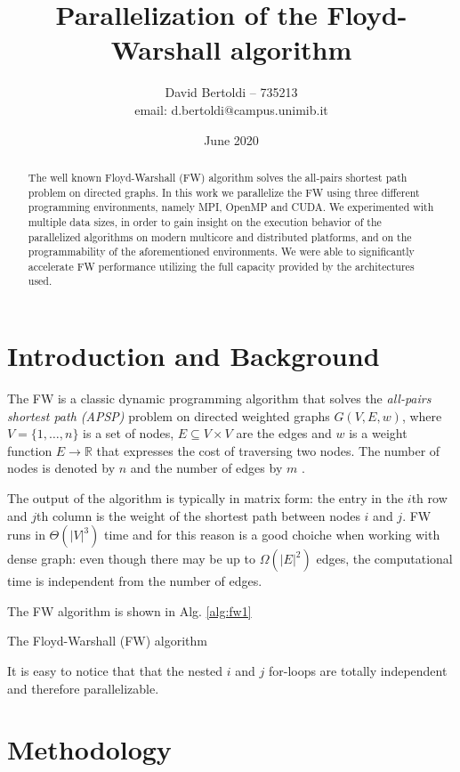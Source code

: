 \documentclass[twocolumns]{IEEEtran}
\title{Parallelization of the Floyd-Warshall algorithm}
\author{David Bertoldi -- 735213 \\ email: d.bertoldi@campus.unimib.it}
\affil{Department of Informatics, Systems and Communication}
\affil{University of Milano-Bicocca}
\date{June 2020}
\begin{document}
\maketitle 
\begin{abstract}
The well known Floyd-Warshall (FW) algorithm solves the all-pairs shortest path problem on directed graphs. In this work we parallelize the FW using three different
programming environments, namely MPI, OpenMP and CUDA. We experimented with multiple data sizes, in order to gain insight on the execution behavior
of the parallelized algorithms on modern multicore and distributed platforms, and on the programmability of the aforementioned environments. We were able
to significantly accelerate FW performance utilizing the full capacity provided by the architectures used.
\end{abstract}
\section{Introduction and Background}
The FW is a classic dynamic programming algorithm that solves the \emph{all-pairs shortest path (APSP)} problem on directed weighted
graphs $G(V, E, w)$, where $V = \{1, \dots, n\}$ is a set of nodes, $E \subseteq V \times V$ are the edges and $w$ is a weight function $E \rightarrow  \mathbb{R}$
that expresses the cost of traversing two nodes. The number of nodes is denoted by $n$ and the number of edges by $m$ . \par
The output of the algorithm is typically in matrix form: the entry in the $i$th row and $j$th column is the weight of the shortest path between
nodes $i$ and $j$. FW runs in $\Theta(|V|^3)$ time and for this reason is a good choiche when working with dense graph: even though there
may be up to $\Omega(|E|^2)$ edges, the computational time is independent from the number of edges. \par
The FW algorithm is shown in Alg. \ref{alg:fw1}

\begin{algorithm}[h!]
\label{alg:fw1}
\SetAlgoLined

 
 \caption[alg:fw1]{The Floyd-Warshall (FW) algorithm}
\end{algorithm}

It is easy to notice that that the nested $i$ and $j$ for-loops are totally independent and therefore parallelizable.


\section{Methodology}





\end{document}
